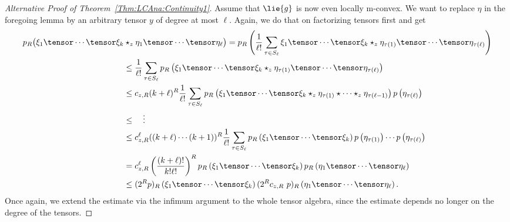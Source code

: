 \begin{proof}[Alternative Proof of Theorem~\ref{Thm:LCAna:Continuity1}]
    Assume that $\lie{g}$ is now even locally m-convex.  We want to
    replace $\eta$ in the foregoing lemma by an arbitrary tensor $y$
    of degree at most $\ell$. Again, we do that on factorizing tensors
    first and get
    \begin{align*}
        p_R \big(
         	\xi_1 \tensor \cdots \tensor \xi_k 
		&
         	\ostar_z 
         	\eta_1 \tensor \cdots \tensor \eta_\ell
        \big)
        =
        p_R \left(
	        \frac{1}{\ell !}
         	\sum\limits_{\tau \in S_\ell}
         	\xi_1 \tensor \cdots \tensor \xi_k 
         	\ostar_z
         	\eta_{\tau(1)} \tensor \cdots \tensor \eta_{\tau(\ell)}
        \right)
        \\
        & \leq
        \frac{1}{\ell !}
        \sum\limits_{\tau \in S_\ell}
        p_R \left(
         	\xi_1 \tensor \cdots \tensor \xi_k 
         	\ostar_z
         	\eta_{\tau(1)} \tensor \cdots \tensor \eta_{\tau(\ell)}
        \right)
        \\
        & \leq
        c_{z,R} (k + \ell)^R
        \frac{1}{\ell !}
        \sum\limits_{\tau \in S_\ell}
        p_R \left(
         	\xi_1 \tensor \cdots \tensor \xi_k 
         	\ostar_z 
         	\eta_{\tau(1)} \ostar \cdots \ostar_z \eta_{\tau(\ell - 1)}
        \right)
        p\left( \eta_{\tau(\ell)} \right)
        \\
        & \leq
        \quad \vdots
        \\
        & \leq
        c_{z,R}^{\ell} ((k + \ell) \cdots (k + 1))^R
        \frac{1}{\ell !}
        \sum\limits_{\tau \in S_\ell}
        p_R \left( \xi_1 \tensor \cdots \tensor \xi_k \right)
        p \left( \eta_{\tau(1)} \right)
        \cdots
        p \left( \eta_{\tau(\ell)} \right)
        \\
        & =
        c_{z,R}^{\ell} \left(
        \frac{(k + \ell)!}{k! \ell!}
        \right)^R
        p_R \left( \xi_1 \tensor \cdots \tensor \xi_k \right)
        p_R \left( \eta_1 \tensor \cdots \tensor \eta_\ell \right)
        \\
        & \leq
        (2^R p)_R 
        \left( \xi_1 \tensor \cdots \tensor \xi_k \right)
        (2^R c_{z,R}\ p)_R 
        \left( \eta_1 \tensor \cdots \tensor \eta_\ell \right).
    \end{align*}
    Once again, we extend the estimate via the infimum argument to the whole
    tensor algebra, since the estimate depends no longer on the degree
    of the tensors.
\end{proof}


